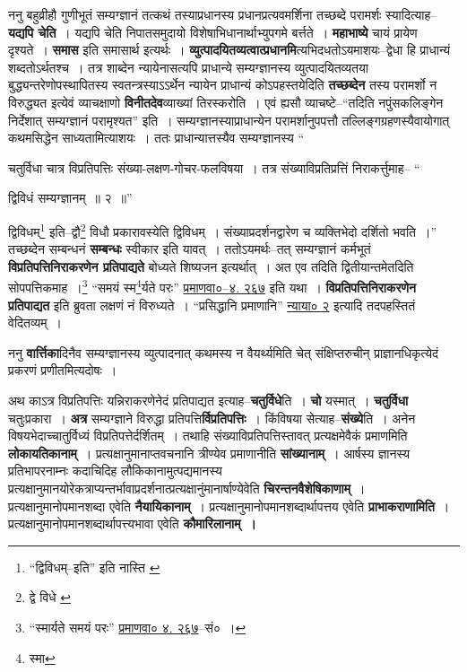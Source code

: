 \documentclass[article,12pt,a4paper]{memoir}
\begin{document}
	  \pstart ननु बहुव्रीहौ गुणीभूतं सम्यग्ज्ञानं तत्कथं तस्याप्रधानस्य प्रधानप्रत्यवमर्शिना तच्छब्दे परामर्शः स्यादित्याह--\textbf{यद्यपि चेति} । यद्यपि चेति निपातसमुदायो विशेषाभिधानार्थाभ्युपगमे बर्त्तते । \textbf{महाभाष्ये} चायं प्रायेण दृश्यते । \textbf{समास} इति समासार्थ इत्यर्थः । \textbf{व्युत्पादयितव्यत्वात्प्रधानमि}त्यभिदधतोऽयमाशयः--द्वेधा हि प्राधान्यं शब्दतोऽर्थतश्च । तत्र शाब्देन न्यायेनासत्यपि प्राधान्ये सम्यग्ज्ञानस्य व्युत्पादयितव्यतया बुद्ध्यन्तरेणोपस्थापितस्य स्वतन्त्रस्याऽऽर्थेन न्यायेन प्राधान्यं कोऽपहस्तयेदिति \textbf{तच्छब्देन} तस्य परामर्शो न विरुद्ध्यत इत्येवं व्याचक्षाणो \textbf{विनीतदेव}व्याख्यां तिरस्करोति । एवं ह्यसौ व्याचष्टे--“तदिति नपुंसकलिङ्गेन निर्देशात् सम्यग्ज्ञानं परामृश्यत” इति । सम्यग्ज्ञानस्याप्राधान्येन परामर्शानुपपत्तौ तल्लिङ्गग्रहणस्यैवायोगात् कथमसिद्धेन साध्यतामित्याशयः । ततः प्राधान्यात्तस्यैव सम्यग्ज्ञानस्य  \leavevmode{} “
	  
	चतुर्विधा चात्र विप्रतिपत्तिः संख्या-लक्षण-गोचर-फलविषया । तत्र संख्याविप्रतिप्रत्तिं निराकर्त्तुमाह-- “
	  
	द्विविधं सम्यग्ज्ञानम् ॥ २ ॥” 
	  
	द्विविधम्\footnote{“द्विविधम्--इति” इति नास्ति \cite{dp-edH}} इति--द्वौ\footnote{द्वे विधे \cite{dp-msB}} विधौ प्रकारावस्येति द्विविधम् । संख्याप्रदर्शनद्वारेण च व्यक्तिभेदो दर्शितो भवति ।” तच्छब्देन सम्बन्धनं \textbf{सम्बन्धः} स्वीकार इति यावत् । ततोऽयमर्थः--तत् सम्यग्ज्ञानं कर्मभूतं \textbf{विप्रतिपत्तिनिराकरणेन प्रतिपाद्यते} बोध्यते शिष्यजन इत्यर्थात् । अत एव तदिति द्वितीयान्तमेतदिति सोपपत्तिकमाह ।\footnote{“स्मार्यते समयं परः” \href{http://http://sarit.indology.info/?cref=pv.4.267}{प्रमाणवा० ४. २६७}--सं० ।} “समयं स्म\footnote{स्मा}\-र्यते परः” \href{http://http://sarit.indology.info/?cref=pv.4.267}{प्रमाणवा०--४. २६७} इति यथा । \textbf{विप्रतिपत्तिनिराकरणेन प्रतिपाद्यत} इति ब्रुवता लक्षणं नं विरुध्यते । “प्रसिद्धानि प्रमाणानि” \href{http://http://sarit.indology.info/?cref=nā.2}{न्याया० २} इत्यादि तदपहस्तितं वेदितव्यम् ।
	\pend
      

	  \pstart ननु \textbf{वार्त्तिका}दिनैव सम्यग्ज्ञानस्य व्युत्पादनात् कथमस्य न वैयर्थ्यमिति चेत् संक्षिप्तरुचीन् प्राज्ञानधिकृत्येदं प्रकरणं प्रणीतमित्यदोषः ।
	\pend
      

	  \pstart अथ काऽत्र विप्रतिपत्तिः यन्निराकरणेनेदं प्रतिपाद्यत इत्याह--\textbf{चतुर्विधे}ति । \textbf{चो} यस्मात् । \textbf{चतुर्विधा} चतुःप्रकारा । \textbf{अत्र} सम्यग्ज्ञाने विरुद्धा प्रतिपत्ति\textbf{र्विप्रतिपत्तिः} । किंविषया सेत्याह--\textbf{संख्ये}ति । अनेन विषयभेदाच्चातुर्विध्यं विप्रतिपत्तेर्दर्शितम् । तथाहि संख्याविप्रतिपत्तिस्तावत् प्रत्यक्षमेवैकं प्रमाणमिति \textbf{लोकायतिकानाम्} । प्रत्यक्षानुमानाप्तवचनानि त्रीण्येव प्रमाणानीति \textbf{सांख्यानाम्} । आर्षस्य ज्ञानस्य प्रतिभापरनाम्नः कदाचिदिह लौकिकानामुत्पद्यमानस्य प्रत्यक्षानुमानयोरेकत्राप्यन्तर्भावाप्रदर्शनात्प्रत्यक्षानुंमानार्षाण्येवेति \textbf{चिरन्तनवैशेषिकाणाम्} । प्रत्यक्षानुमानोपमानशब्दा एवेति \textbf{नैयायिकानाम्} । प्रत्यक्षानुमानोपमानशब्दार्थापत्तय एवेति \textbf{प्राभाकराणामिति} । प्रत्यक्षानुमानोपमानशब्दार्थापत्त्यभावा एवेति \textbf{कौमारिलानाम् ।}
	\pend
      
\end{document}
